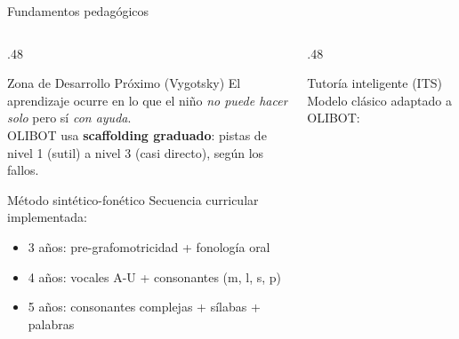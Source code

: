 \documentclass[aspectratio=169, 10pt]{beamer}
\begin{document}
\begin{frame}{Fundamentos pedagógicos}
  \begin{columns}[T]
    \begin{column}{.48\textwidth}
      \begin{exampleblock}{Zona de Desarrollo Próximo (Vygotsky)}
        \footnotesize
        El aprendizaje ocurre en lo que el niño \textit{no puede hacer solo} pero sí \textit{con ayuda}.\\[4pt]
        OLIBOT usa \textbf{scaffolding graduado}: pistas de nivel 1 (sutil) a nivel 3 (casi directo), según los fallos.
      \end{exampleblock}
      \vspace{2pt}
      \begin{block}{Método sintético-fonético}
        \footnotesize
        Secuencia curricular implementada:
        \begin{itemize}
          \item 3 años: pre-grafomotricidad + fonología oral
          \item 4 años: vocales A-U + consonantes (m, l, s, p)
          \item 5 años: consonantes complejas + sílabas + palabras
        \end{itemize}
      \end{block}
    \end{column}
    \begin{column}{.48\textwidth}
      \begin{block}{Tutoría inteligente (ITS)}
        \footnotesize
        Modelo clásico adaptado a OLIBOT:
        \begin{center}
        \end{center}
      \end{block}
    \end{column}
  \end{columns}
\end{frame}
\end{document}

